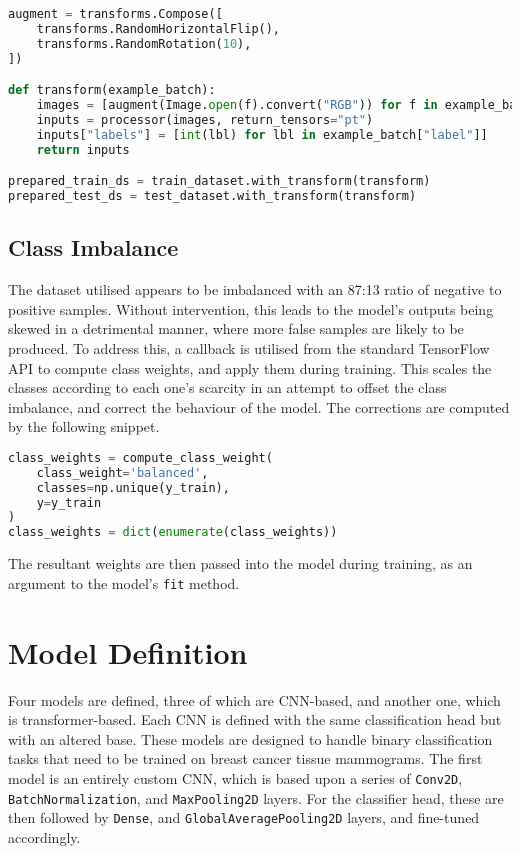 \documentclass[../main]{subfiles}
\begin{document}
\begin{lstlisting}[language=Python, caption={Data augmentation for the ViT model.}]
augment = transforms.Compose([
    transforms.RandomHorizontalFlip(),
    transforms.RandomRotation(10),
])

def transform(example_batch):
    images = [augment(Image.open(f).convert("RGB")) for f in example_batch["file"]]
    inputs = processor(images, return_tensors="pt")
    inputs["labels"] = [int(lbl) for lbl in example_batch["label"]]
    return inputs

prepared_train_ds = train_dataset.with_transform(transform)
prepared_test_ds = test_dataset.with_transform(transform)
\end{lstlisting}

\subsection{Class Imbalance}
The dataset utilised appears to be imbalanced with
an 87:13 ratio of negative to positive samples. Without intervention, this leads
to the model's outputs being skewed in a detrimental manner, where more false
samples are likely to be produced. To address this, a callback is
utilised from the standard TensorFlow API to compute class weights, and apply
them during training. This scales the classes according to each one's scarcity
in an attempt to offset the class imbalance, and correct the behaviour of the
model. The corrections are computed by the following snippet.

\begin{lstlisting}[language=Python, caption={Correcting the class imbalance.}]
class_weights = compute_class_weight(
    class_weight='balanced',
    classes=np.unique(y_train),
    y=y_train
)
class_weights = dict(enumerate(class_weights))
\end{lstlisting}

\noindent The resultant weights are then passed into the model during training,
as an argument to the model's \texttt{fit} method.

\section{Model Definition}
Four models are defined, three of which are CNN-based, and another one, which is
transformer-based. Each CNN is defined with the same classification head but
with an altered base. These models are designed to handle binary classification tasks
that need to be trained on breast cancer tissue mammograms. The first model is
an entirely custom CNN, which is based upon a series of \texttt{Conv2D},
\texttt{BatchNormalization}, and \texttt{MaxPooling2D} layers. For the
classifier head, these are then followed by \texttt{Dense}, and
\texttt{GlobalAveragePooling2D} layers, and fine-tuned accordingly.
\end{document}
